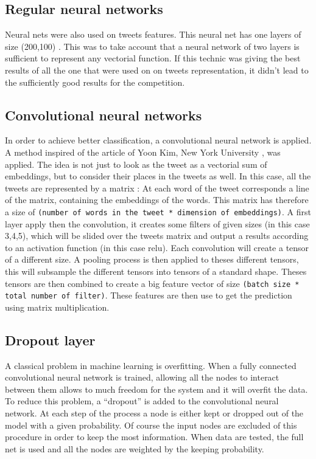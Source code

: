 \subsection{Regular neural networks}

Neural nets were also used on tweets features. This neural net has one layers of size (200,100) . This was to take account that a neural network of  two layers is sufficient to represent any vectorial function.  If this technic was giving the best results of all the one that were used on on tweets representation, it didn't lead to the sufficiently good results for the competition. 

\subsection{Convolutional neural networks}

In order to achieve better classification, a convolutional neural network is applied. A method inspired of the article of Yoon Kim, New York University \cite{cnnYoon}, was applied. The idea is not just to look as the tweet as a vectorial sum of embeddings, but to consider their places in the tweets as well. In this case, all the tweets are represented by a matrix :  At each word of the tweet corresponds a line of the matrix, containing the embeddings of the words. This matrix has therefore a size of \texttt{(number of words in the tweet * dimension of embeddings)}. A first layer apply then the convolution, it creates some filters of given sizes (in this case  3,4,5), which will be slided over the tweets matrix and output a results according to an activation function (in this case relu). Each convolution will create a tensor of a different size. A pooling process is then applied to theses different tensors, this will subsample the different tensors into tensors of a standard shape. Theses tensors are then combined to create a big feature vector of size \texttt{(batch size * total number of filter)}. These features are then use to get the prediction using matrix multiplication. 

\subsection{Dropout layer}
A classical problem in machine learning is overfitting. When a fully connected convolutional neural network is trained, allowing all the nodes to interact between them allows to much freedom for the system and it will overfit the data. To reduce this problem, a ``dropout'' is added to the convolutional neural network. At each step of the process a node is either kept or dropped out of the model with a given probability.  Of course the input nodes are excluded of this procedure in order to keep the most information. When data are tested, the full net is used and all the nodes are weighted by the keeping probability. 

